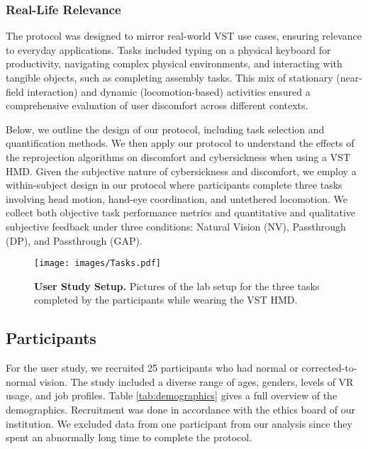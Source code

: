 {{\subsubsection{Real-Life Relevance}
The protocol was designed to mirror real-world VST use cases, ensuring relevance to everyday applications. Tasks included typing on a physical keyboard for productivity, navigating complex physical environments, and interacting with tangible objects, such as completing assembly tasks. This mix of stationary (near-field interaction) and dynamic (locomotion-based) activities ensured a comprehensive evaluation of user discomfort across different contexts.
}}

Below, we outline the design of our protocol, including task selection and quantification methods. We then apply our protocol to understand the effects of the reprojection algorithms on discomfort and cybersickness when using a VST HMD. Given the subjective nature of cybersickness and discomfort, we employ a within-subject design in our protocol where participants complete three tasks involving head motion, hand-eye coordination, and untethered locomotion. We collect both objective task performance metrics and quantitative and qualitative subjective feedback under three conditions: Natural Vision (NV), \Directpassthrough Passthrough (DP), and \DepthPassthrough Passthrough (GAP).

\begin{figure*}[ht]
    \centering
    \texttt{[image: images/Tasks.pdf]}
    \caption{\textbf{User Study Setup.} Pictures of the lab setup for the three tasks completed by the participants while wearing the VST HMD.}
    \label{fig:tasks}
\end{figure*}

\subsection{Participants}
For the user study, we recruited 25 participants who had normal or corrected-to-normal vision. The study included a diverse range of ages, genders, levels of VR usage, and job profiles. Table \ref{tab:demographics} gives a full overview of the demographics. Recruitment was done in accordance with the ethics board of our institution. We excluded data from one participant from our analysis since they spent an abnormally long time to complete the protocol. 


